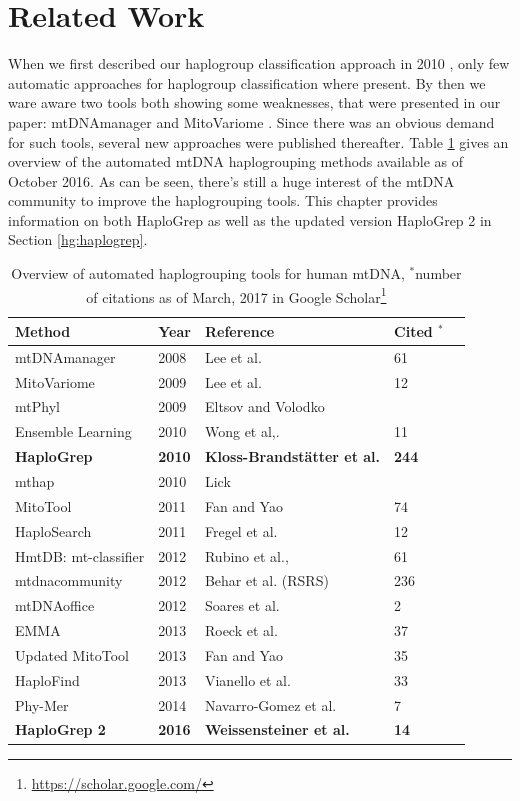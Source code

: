 \section{Related Work}\label{hg:related}
When we first described our haplogroup classification approach in 2010 \cite{Kloss-Brandstatter2011}, only few automatic approaches for haplogroup classification where present. By then we ware aware two tools both showing some weaknesses, that were presented in our paper: mtDNAmanager \cite{Lee2008}  and MitoVariome \cite{Lee2009}. Since there was an obvious demand for such tools, several new approaches were published thereafter. Table \ref{table:tools} gives an overview of the automated mtDNA haplogrouping methods available as of October 2016. As can be seen, there's still a huge interest of the mtDNA community to improve the haplogrouping tools. This chapter provides information on both HaploGrep as well as the updated version HaploGrep 2 in Section \ref{hg:haplogrep}.

\begin{table}
  \begin{tabular}{lllll}
    \toprule
    Method  & Year &  Reference & Cited $^*$\\ 
		\midrule
		mtDNAmanager & 2008 & Lee et al. \cite{Lee2008} & 61\\ 
		MitoVariome & 2009  & Lee et al. \cite{Lee2009} & 12\\
		mtPhyl & 2009 &  Eltsov and Volodko \cite{eltsov2009mtphyl} & \\
		Ensemble Learning & 2010 &  Wong et al,. \cite{Wong2011} & 11  \\ 
		\textbf{HaploGrep} & \textbf{2010} & \textbf{Kloss-Brandst{\"a}tter et al.} \cite{Kloss-Brandstatter2011} & \textbf{244}  \\ 
		mthap & 2010 & Lick&\\ 
		MitoTool & 2011 & Fan and Yao \cite{Fan2011} & 74\\
		HaploSearch & 2011 & Fregel et al. \cite{Fregel2011}  & 12 \\
		HmtDB: mt-classifier & 2012 & Rubino et al., \cite{Rubino2012}& 61 \\
		mtdnacommunity & 2012 & Behar et al. \cite{Behar2012} (RSRS) & 236\\
		mtDNAoffice & 2012 & Soares et al. \cite{Soares2012} & 2 \\
		EMMA & 2013 & Roeck et al. \cite{Rock2013} & 37\\
		Updated MitoTool& 2013& Fan and Yao \cite{Fan2013} & 35\\
		HaploFind & 2013 & Vianello et al. \cite{Vianello2013} & 33\\
		Phy-Mer & 2014 & Navarro-Gomez et al. \cite{Navarro-gomez2014} & 7\\
		\textbf{HaploGrep 2} & \textbf{2016} & \textbf{Weissensteiner et al.} \cite{Weissensteiner2016a}  & \textbf{14}\\

		\bottomrule
\end{tabular}
\caption[Related work]{Overview of automated haplogrouping tools for human mtDNA, $^*$number of citations as of March, 2017 in Google Scholar\footnote{\url{https://scholar.google.com/}}}
\label{table:tools}
\end{table}

